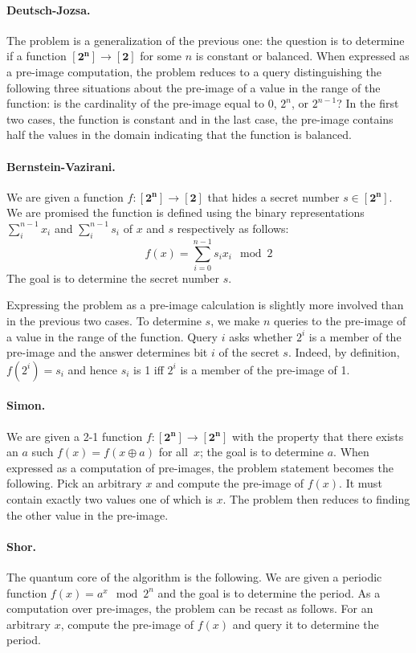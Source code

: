 \documentclass{article}
\newcommand{\finset}[1]{[\mathbf{#1}]}
\begin{document}
\paragraph*{Deutsch-Jozsa.}
The problem is a generalization of the previous one: the question is
to determine if a function $\finset{2^n} \rightarrow \finset{2}$ for
some $n$ is constant or balanced. When expressed as a pre-image
computation, the problem reduces to a query distinguishing the
following three situations about the pre-image of a value in the range
of the function: is the cardinality of the pre-image equal to 0,
$2^n$, or $2^{n-1}$? In the first two cases, the function is constant
and in the last case, the pre-image contains half the values in the
domain indicating that the function is balanced.

\paragraph*{Bernstein-Vazirani.}
We are given a function $f : \finset{2^n} \rightarrow \finset{2}$
that hides a secret number $s \in \finset{2^n}$. We are promised the
function is defined using the binary representations $\sum_i^{n-1}
x_i$ and $\sum_i^{n-1} s_i$ of $x$ and $s$ respectively as follows:
\[
f(x) = \sum_{i=0}^{n-1} s_ix_i \mod{2}
\]
The goal is to determine the secret number $s$. 

Expressing the problem as a pre-image calculation is slightly more
involved than in the previous two cases. To determine $s$, we make $n$
queries to the pre-image of a value in the range of the
function. Query $i$ asks whether $2^i$ is a member of the pre-image
and the answer determines bit $i$ of the secret $s$. Indeed, by
definition, $f(2^i) = s_i$ and hence $s_i$ is 1 iff $2^i$ is a member
of the pre-image of 1.

\paragraph*{Simon.}
We are given a 2-1 function $f : \finset{2^n} \rightarrow
\finset{2^n}$ with the property that there exists an $a$ such $f(x) =
f(x \oplus a)$ for all~$x$; the goal is to determine $a$. When
expressed as a computation of pre-images, the problem statement
becomes the following. Pick an arbitrary $x$ and compute the pre-image
of $f(x)$. It must contain exactly two values one of which is $x$. The
problem then reduces to finding the other value in the pre-image.

\paragraph*{Shor.}
The quantum core of the algorithm is the following. We are given a
periodic function $f(x) = a^x \mod{2^n}$ and the goal is to determine
the period. As a computation over pre-images, the problem can be
recast as follows. For an arbitrary $x$, compute the pre-image of
$f(x)$ and query it to determine the period.
\end{document}

